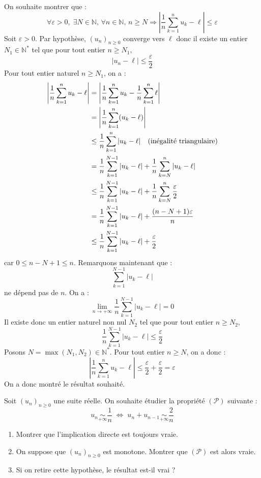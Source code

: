 \documentclass[a4paper,10pt]{report}
\begin{document}
\corr On souhaite montrer que :
$$ \forall \varepsilon>0, \; \exists N \in \mathbb{N}, \, \forall n \in \mathbb{N}, \, n \geq N \Longrightarrow \left\vert \frac{1}{n} \sum_{k=1}^n u_k - \ell \right\vert \leq \varepsilon$$
Soit $\varepsilon>0$. Par hypothèse, $(u_n)_{n \geq 0}$ converge vers $\ell$ donc il existe un entier $N_1 \in \mathbb{N}^*$ tel que pour tout entier $n \geq N_1$,
$$ \vert u_n - \ell \vert \leq \dfrac{\varepsilon}{2}$$
Pour tout entier naturel $n \geq N_1$, on a :
\begin{align*}
\left\vert \frac{1}{n} \sum_{k=1}^n u_k - \ell \right\vert & = \left\vert \frac{1}{n} \sum_{k=1}^n u_k - \frac{1}{n} \sum_{k=1}^n \ell \right\vert \\
& = \left\vert \frac{1}{n} \sum_{k=1}^n (u_k - \ell) \right\vert \\
& \leq \dfrac{1}{n} \sum_{k=1}^n \vert u_k - \ell \vert  \quad \hbox{(inégalité triangulaire)} \\
& = \dfrac{1}{n} \sum_{k=1}^{N-1} \vert u_k - \ell \vert + \dfrac{1}{n} \sum_{k=N}^n \vert u_k - \ell \vert \\
& \leq \dfrac{1}{n} \sum_{k=1}^{N-1} \vert u_k - \ell \vert + \dfrac{1}{n} \sum_{k=N}^n \dfrac{\varepsilon}{2} \\
& = \dfrac{1}{n} \sum_{k=1}^{N-1} \vert u_k - \ell \vert + \dfrac{(n-N+1) \varepsilon}{n}  \\
& \leq  \dfrac{1}{n} \sum_{k=1}^{N-1} \vert u_k - \ell \vert +\dfrac{\varepsilon}{2} \\
\end{align*}
car $0 \leq n-N+1 \leq n$. Remarquons maintenant que :
$$\sum_{k=1}^{N-1} \vert u_k - \ell \vert$$
ne dépend pas de $n$. On a :
$$ \lim_{n \rightarrow + \infty} \dfrac{1}{n} \sum_{k=1}^{N-1} \vert u_k - \ell \vert = 0$$
Il existe donc un entier naturel non nul $N_2$ tel que pour tout entier $n \geq N_2$,
$$ \dfrac{1}{n} \sum_{k=1}^{N-1} \vert u_k - \ell \vert \leq \dfrac{\varepsilon}{2}$$
Posons $N= \max(N_1, N_2) \in \mathbb{N}^*$. Pour tout entier $n \geq N$, on a donc :
$$ \left\vert \frac{1}{n} \sum_{k=1}^n u_k - \ell \right\vert \leq \dfrac{\varepsilon}{2} +  \dfrac{\varepsilon}{2} = \varepsilon$$
On a donc montré le résultat souhaité. 

\medskip

\begin{Exa} Soit $(u_n)_{n \geq 0}$ une suite réelle. On souhaite étudier la propriété $(\mathcal{P})$ suivante :
$$ u_n \underset{+ \infty}{\sim} \dfrac{1}{n} \; \Longleftrightarrow \; u_n + u_{n-1} \underset{+ \infty}{\sim} \dfrac{2}{n}$$
\begin{enumerate}
\item Montrer que l'implication directe est toujours vraie.
\item On suppose que $(u_n)_{n \geq 0}$ est monotone. Montrer que $(\mathcal{P})$ est alors vraie.
\item Si on retire cette hypothèse, le résultat est-il vrai ?
\end{enumerate}
\end{Exa}
\end{document}

